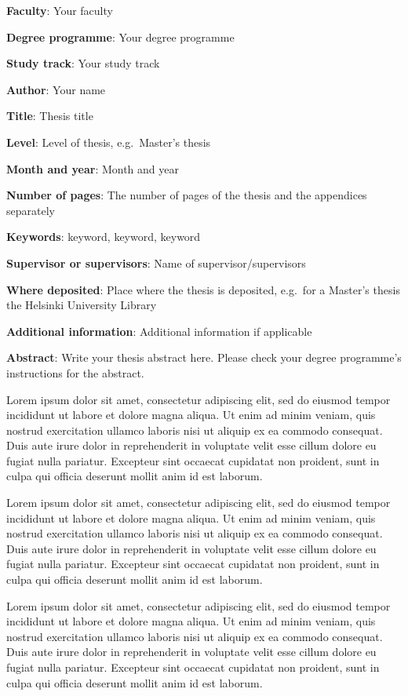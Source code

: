\documentclass[12pt,a4paper]{article}
\begin{document}
\textbf{Faculty}: Your faculty

\textbf{Degree programme}: Your degree programme

\textbf{Study track}: Your study track

\textbf{Author}: Your name

\textbf{Title}: Thesis title

\textbf{Level}: Level of thesis, e.g.~Master's thesis

\textbf{Month and year}: Month and year

\textbf{Number of pages}: The number of pages of the thesis and the
appendices separately

\textbf{Keywords}: keyword, keyword, keyword

\textbf{Supervisor or supervisors}: Name of supervisor/supervisors

\textbf{Where deposited}: Place where the thesis is deposited, e.g.~for
a Master's thesis the Helsinki University Library

\textbf{Additional information}: Additional information if applicable

\textbf{Abstract}: Write your thesis abstract here. Please check your
degree programme's instructions for the abstract.

Lorem ipsum dolor sit amet, consectetur adipiscing elit, sed do eiusmod
tempor incididunt ut labore et dolore magna aliqua. Ut enim ad minim
veniam, quis nostrud exercitation ullamco laboris nisi ut aliquip ex ea
commodo consequat. Duis aute irure dolor in reprehenderit in voluptate
velit esse cillum dolore eu fugiat nulla pariatur. Excepteur sint
occaecat cupidatat non proident, sunt in culpa qui officia deserunt
mollit anim id est laborum.

Lorem ipsum dolor sit amet, consectetur adipiscing elit, sed do eiusmod
tempor incididunt ut labore et dolore magna aliqua. Ut enim ad minim
veniam, quis nostrud exercitation ullamco laboris nisi ut aliquip ex ea
commodo consequat. Duis aute irure dolor in reprehenderit in voluptate
velit esse cillum dolore eu fugiat nulla pariatur. Excepteur sint
occaecat cupidatat non proident, sunt in culpa qui officia deserunt
mollit anim id est laborum.

Lorem ipsum dolor sit amet, consectetur adipiscing elit, sed do eiusmod
tempor incididunt ut labore et dolore magna aliqua. Ut enim ad minim
veniam, quis nostrud exercitation ullamco laboris nisi ut aliquip ex ea
commodo consequat. Duis aute irure dolor in reprehenderit in voluptate
velit esse cillum dolore eu fugiat nulla pariatur. Excepteur sint
occaecat cupidatat non proident, sunt in culpa qui officia deserunt
mollit anim id est laborum.
\end{document}
